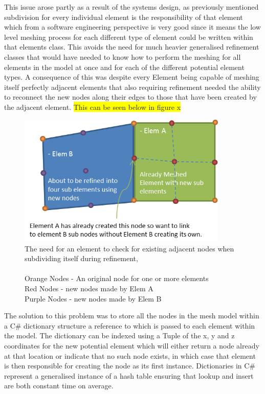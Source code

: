 \noindent
This issue arose partly as a result of the systems design, as previously mentioned subdivision for every individual element is the responsibility of that element which from a software engineering perspective is very good since it means the low level meshing process for each different type of element could be written within that elements class. This avoids the need for much heavier generalised refinement classes that would have needed to know how to perform the meshing for all elements in the model at once and for each of the different potential element types. A consequence of this was despite every Element being capable of meshing itself perfectly adjacent elements that also requiring refinement needed the ability to reconnect the new nodes along their edges to those that have been created by the adjacent element. \colorbox{yellow}{This can be seen below in figure x} \\ 


\begin{figure}[!h]
  \centerline{\includegraphics[width=100mm , scale=1]{../Graphics/nodeLinking.png}}
  \caption{The need for an element to check for existing adjacent nodes when subdividing itself during refinement,\\ \\
  	Orange Nodes - An original node for one or more elements \\
	Red Nodes - new nodes made by Elem A \\
	Purple Nodes - new nodes made by Elem B \\
  }
  \label{fig:h-refinementImp}
\end{figure}


\noindent
The solution to this problem was to store all the nodes in the mesh model within a C\# dictionary structure a reference to which is passed to each element within the model. The dictionary can be indexed using a Tuple of the x, y and z coordinates for the new potential element which will either return a node already at that location or indicate that no such node exists, in which case that element is then responsible for creating the node as its first instance. Dictionaries in C\# represent a generalised instance of a hash table ensuring that lookup and insert are both constant time on average.

